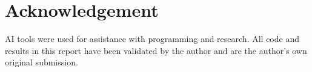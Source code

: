 \section*{Acknowledgement}
\label{sec:acknowledgement}

AI tools were used for assistance with programming and research. All code and
results in this report have been validated by the author and are the author's
own original submission.
